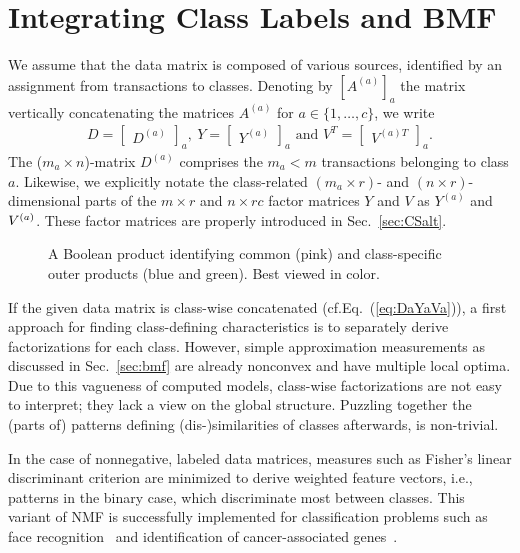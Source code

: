 \section{Integrating Class Labels and BMF}\label{sec:CS:IntegrateLabels}
We assume that the data matrix is composed of various sources, identified by an assignment from transactions to classes. Denoting by $[A^{(a)}]_a$ the matrix vertically concatenating the matrices $A^{(a)}$ for $a\in\{1,\ldots,c\}$, we write
\begin{align}\label{eq:DaYaVa}
D=\begin{bmatrix}
D^{(a)}
\end{bmatrix}_a,\
Y=\begin{bmatrix}
Y^{(a)}
\end{bmatrix}_a \text{ and }
V^T=\begin{bmatrix}
V^{(a)T}
\end{bmatrix}_a.
\end{align}
The ($m_a\times n$)-matrix $D^{(a)}$ comprises the $m_a<m$ transactions belonging to class $a$. Likewise, we explicitly notate the class-related $(m_a\times r)$- and $(n\times r)$-dimensional parts of the $m\times r$ and $n\times rc$ factor matrices $Y$ and $V$ as $Y^{(a)}$ and $V^{(a)}$. These factor matrices are properly introduced in Sec.~\ref{sec:CSalt}.
\begin{figure}[!t]
\centering

\caption{A Boolean product identifying common (pink) and class-specific outer products (blue and green). Best viewed in color.}
\label{fig:usageJSMF}
\end{figure}
If the given data matrix is class-wise concatenated (cf.\@ Eq.~(\ref{eq:DaYaVa})), a first approach for finding class-defining characteristics is to separately derive factorizations for each class. However, simple approximation measurements as discussed in Sec.~\ref{sec:bmf} are already nonconvex and have multiple local optima.
Due to this vagueness of computed models, class-wise factorizations are not easy to interpret; they lack a view on the global structure. Puzzling together the (parts of) patterns defining (dis-)similarities of classes afterwards, is non-trivial.

In the case of nonnegative, labeled data matrices, measures such as Fisher's linear discriminant criterion are minimized to derive weighted feature vectors, i.e., patterns in the binary case, which discriminate most between classes. This variant of NMF is successfully implemented for classification problems such as face recognition~\citep{nikitidis2014projected} and identification of cancer-associated genes~\citep{odibat2014efficient}.

